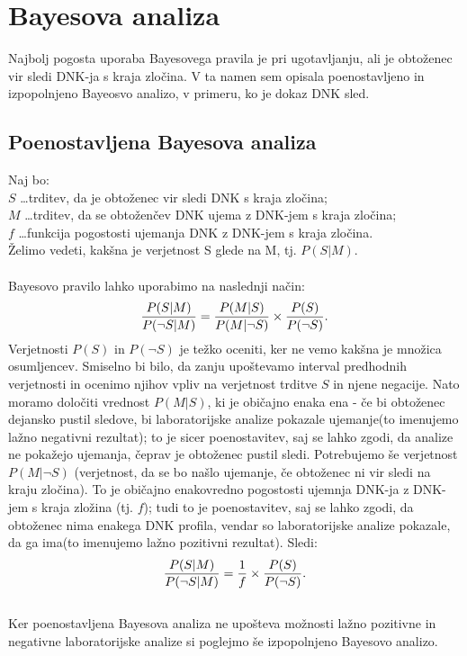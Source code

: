 \documentclass[12pt,a4paper]{amsart}
\theoremstyle{definition} %
\theoremstyle{plain} %
\begin{document}
\section{Bayesova analiza}
Najbolj pogosta uporaba Bayesovega pravila je pri ugotavljanju, ali je obtoženec vir sledi DNK-ja s kraja zločina. V ta namen sem opisala poenostavljeno 
in izpopolnjeno Bayeosvo analizo, v primeru, ko je dokaz DNK sled.

\subsection{Poenostavljena Bayesova analiza}
Naj bo:\\
$S$ \dots trditev, da je obtoženec vir sledi DNK s kraja zločina; \\
$M$ \dots trditev, da se obtoženčev DNK ujema z DNK-jem s kraja zločina; \\
$f$ \dots funkcija pogostosti ujemanja DNK z DNK-jem s kraja zločina. \\
Želimo vedeti, kakšna je verjetnost S glede na M, tj. $P(S \lvert M)$. \\\\
Bayesovo pravilo lahko uporabimo na naslednji način:
\[
   \frac{P(S \lvert M)}{P(\neg S \lvert M)} = \frac{P(M \lvert S)}{P(M \lvert \neg S)} \times \frac{P(S)}{P(\neg S)}. \vspace{2mm}
\]
Verjetnosti $P(S)$ in $P(\neg S)$ je težko oceniti, ker ne vemo kakšna je množica osumljencev. Smiselno bi bilo, da zanju upoštevamo interval
predhodnih verjetnosti in ocenimo njihov vpliv na verjetnost trditve $S$ in njene negacije. Nato moramo določiti vrednost $P(M \lvert S)$, ki
je običajno enaka ena - če bi obtoženec dejansko pustil sledove, bi laboratorijske analize pokazale ujemanje(to imenujemo lažno
negativni rezultat); to je sicer poenostavitev, saj se lahko zgodi, da analize ne pokažejo ujemanja, čeprav je obtoženec pustil sledi.
Potrebujemo še verjetnost $P(M \lvert \neg S)$ (verjetnost, da se bo našlo ujemanje, če obtoženec ni vir sledi na kraju zločina). To je
običajno enakovredno pogostosti ujemnja DNK-ja z DNK-jem s kraja zložina (tj. $f$); tudi to je poenostavitev, saj se lahko zgodi, da
obtoženec nima enakega DNK profila, vendar so laboratorijske analize pokazale, da ga ima(to imenujemo lažno pozitivni rezultat).
Sledi:
\[
   \frac{P(S \lvert M)}{P(\neg S \lvert M)} = \frac{1}{f} \times \frac{P(S)}{P(\neg S)}. \vspace{2mm}
\]\\
Ker poenostavljena Bayesova analiza ne upošteva možnosti lažno pozitivne in negativne laboratorijske analize si poglejmo še izpopolnjeno
Bayesovo analizo.
\end{document}
